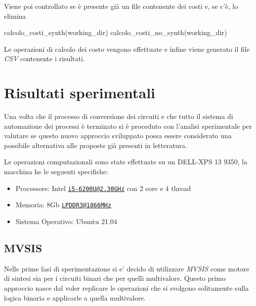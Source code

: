 \documentclass[
  italian,
]{book}
\newenvironment{Shaded}{\begin{snugshade}}{\end{snugshade}}
\newcommand{\NormalTok}[1]{#1}
\providecommand{\tightlist}{%
  \setlength{\itemsep}{0pt}\setlength{\parskip}{0pt}}
\begin{document}
Viene poi controllato se è presente già un file contenente dei costi e, se c'è, lo elimina

\begin{Shaded}
\begin{Highlighting}[]
\NormalTok{calcolo\_costi\_synth(working\_dir)}
\NormalTok{calcolo\_costi\_no\_synth(working\_dir)}
\end{Highlighting}
\end{Shaded}

Le operazioni di calcolo dei costo vengono effettuate e infine viene generato il file \emph{CSV} contenente i risultati.

\hypertarget{risultati-sperimentali}{%
\chapter{Risultati sperimentali}\label{risultati-sperimentali}}

Una volta che il processo di conversione dei circuiti e che tutto il sistema di automazione dei processi è terminato si è proceduto con l'analisi sperimentale per valutare se questo nuovo approccio sviluppato possa essere considerato una possibile alternativa alle proposte già presenti in letteratura.

Le operazioni computazionali sono state effettuate su un DELL-XPS 13 9350, la macchina he le seguenti specifiche:

\begin{itemize}
\tightlist
\item
  Processore: Intel \href{mailto:i5-6200U@2.30GHz}{\nolinkurl{i5-6200U@2.30GHz}} con 2 core e 4 thread
\item
  Memoria: 8Gb \href{mailto:LPDDR3@1866MHz}{\nolinkurl{LPDDR3@1866MHz}}
\item
  Sistema Operativo: Ubuntu 21.04
\end{itemize}

\newpage

\hypertarget{mvsis-2}{%
\section{MVSIS}\label{mvsis-2}}

Nelle prime fasi di sperimentazione si e' decido di utilizzare \emph{MVSIS} come motore di sintesi sia per i circuiti binari che per quelli multivalore. Questo primo approccio nasce dal voler replicare le operazioni che si svolgono solitamente sulla logica binaria e applicarle a quella multivalore.
\end{document}
